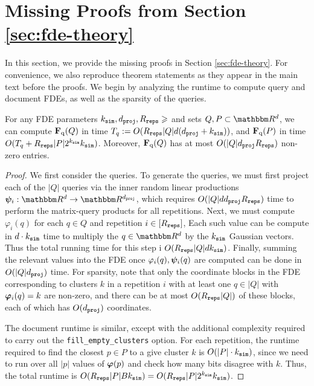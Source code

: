 
\section{Missing Proofs from Section \ref{sec:fde-theory}} \label{app:theory}
In this section, we provide the missing proofs in Section \ref{sec:fde-theory}. For convenience, we also reproduce theorem statements as they appear in the main text before the proofs. We begin by analyzing the runtime to compute query and document FDEs, as well as the sparsity of the queries. 
\begin{lemma}\label{lem:runtime}
For any FDE parameters $k_{\texttt{sim}},d_{\texttt{proj}},R_{\texttt{reps}} \geqslant$ and sets $Q,P \subset \R^d$, we can compute $\mathbf{F}_{\text{q}}(Q)$ in time $T_q : = O(R_{\texttt{reps}} |Q|d ( d_{\texttt{proj}} + k_{\texttt{sim}} ))$, and $\mathbf{F}_{\text{q}}(P)$ in time $O(T_q + R_{\texttt{reps}} |P| 2^{k_{\texttt{sim}}} k_{\texttt{sim}})$. Moreover, $\mathbf{F}_{\text{q}}(Q)$ has at most $O(|Q|d_{\texttt{proj}} R_{\texttt{reps}})$ non-zero entries. 
\end{lemma}
\begin{proof}
We first consider the queries. To generate the queries, we must first project each of the $|Q|$ queries via the inner random linear productions $\bpsi_i:\R^{d} \to \R^{\dproj}$, which requires $O(|Q| d d_{\texttt{proj}} R_{\texttt{reps}} )$ time to perform the matrix-query products for all repetitions. Next, we must compute $\varphi_i(q)$ for each $q \in Q$ and repetition $i \in [R_{\texttt{reps}}]$, Each such value can be compute in $d \cdot k_{\texttt{sim}}$ time to multiply the $q \in \R^d$ by the $k_{\texttt{sim}}$ Gaussian vectors. Thus the total running time for this step i $O(R_{\texttt{reps}} |Q| d k_{\texttt{sim}})$. Finally, summing the relevant values into the FDE once $\varphi_i(q),\boldsymbol{\psi}_i(q)$ are computed can be done in $O(|Q|d_{\texttt{proj}})$ time. For sparsity, note that only the coordinate blocks in the FDE corresponding to clusters $k$ in a repetition $i$ with at least one $q \in |Q|$ with $\boldsymbol{\varphi}_i(q) = k$ are non-zero, and there can be at most $O(R_{\texttt{reps}} |Q|)$ of these blocks, each of which has $O(d_{\texttt{proj}})$ coordinates.

The document runtime is similar, except with the additional complexity required to carry out the \texttt{fill\_empty\_clusters} option. For each repetition, the runtime required to find the closest $p \in P$ to a give cluster $k$ is $O(|P| \cdot k_{\texttt{sim}})$, since we need to run over all $|p|$ values of $\boldsymbol{\varphi}(p)$ and check how many bits disagree with $k$. Thus, the total runtime is $O(R_{\texttt{reps}} |P| B k_{\texttt{sim}}) = O(R_{\texttt{reps}} |P| 2^{k_{\texttt{sim}}} k_{\texttt{sim}})$.
\end{proof}

